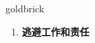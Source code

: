 
\begin{frame}
{\huge goldbrick}
\begin{center}
\begin{enumerate}\Large
  \item \textbf{逃避工作和责任}
\end{enumerate}
\end{center}
\end{frame}
